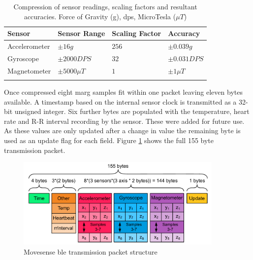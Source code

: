 \begin{table}[hbt]
    \centering
    \caption[Compression of sensor readings, scaling factors and resultant accuracies]{Compression of sensor readings, scaling factors and resultant accuracies. Force of Gravity (g), \acrfull{dps}, MicroTesla ($\mu T$)} %
    \label{tab:methods-imu-data-compression-factors}
    
    \begin{tabularx}{\textwidth}{Y|YYY}
        \textbf{Sensor} & \textbf{Sensor Range} & \textbf{Scaling Factor} & \textbf{Accuracy} \\
        \hline
        Accelerometer & $\pm16 g$ & $256$ & $\pm0.039 g$ \\
        Gyroscope & $\pm2000 DPS$ & $32$ & $\pm0.031 DPS$ \\
        Magnetometer & $\pm5000\mu T$ & $1$ & $\pm1\mu T$ \\
    \end{tabularx}
\end{table}

Once compressed eight \acrshort{marg} samples fit within one packet leaving eleven bytes available. A timestamp based on the internal sensor clock is transmitted as a 32-bit unsigned integer. Six further bytes are populated with the temperature, heart rate and R-R interval recording by the sensor. These were added for future use. As these values are only updated after a change in value the remaining byte is used as an update flag for each field. Figure \ref{fig:methods-ble-packet-structure} shows the full 155 byte transmission packet.

\begin{figure}[hbt]
    \centering
    \includegraphics[width=0.9\textwidth]{content/3-Methods/BLE_Bytes_Packets.pdf}
    \caption[Movesense  transmission packet structure]{Movesense \acrlong{ble} transmission packet structure}    \label{fig:methods-ble-packet-structure}
\end{figure}


